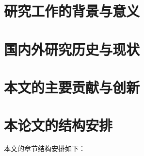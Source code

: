 \thesischapterexordium

\section{研究工作的背景与意义}


\section{国内外研究历史与现状}


\section{本文的主要贡献与创新}


\section{本论文的结构安排}
本文的章节结构安排如下：
